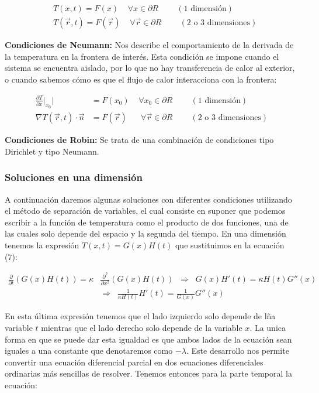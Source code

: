 \documentclass[12pt]{article}
\begin{document}
\begin{align*}
    &T(x,t) = F(x) \;\;\;\; \forall x \in \partial R \;\;\;\;\;\;\;\; (\text{1 dimensión})\\
    &T(\vec{r},t) = F(\vec{r}) \;\;\;\; \forall \vec{r} \in \partial R \;\;\;\;\;\;\;\; (\text{2 o 3 dimensiones})
\end{align*}

\textbf{Condiciones de Neumann: }Nos describe el comportamiento de la derivada de la temperatura en la frontera de interés. Esta condición se impone cuando el sistema se encuentra aislado, por lo que no hay transferencia de calor al exterior, o cuando sabemos cómo es que el flujo de calor interacciona con la frontera:

\begin{align*}
    \frac{\partial T}{\partial x} \Big|_{x_0}| &= F(x_0) \;\;\;\; \forall x_0 \in \partial R \;\;\;\;\;\;\;\; (\text{1 dimensión})\\
    \nabla T(\vec{r},t)\cdot \vec{n} &= F(\vec{r}) \;\;\;\;\;\; \forall \vec{r} \in \partial R \;\;\;\;\;\;\;\; (\text{2 o 3 dimensiones})
\end{align*}

\textbf{Condiciones de Robin: }Se trata de una combinación de condiciones tipo Dirichlet y tipo Neumann. \\

\subsubsection{Soluciones en una dimensión}

A continuación daremos algunas soluciones con diferentes condiciones utilizando el método de separación de variables, el cual consiste en suponer que podemos escribir a la función de temperatura como el producto de dos funciones, una de las cuales solo depende del espacio y la segunda del tiempo. En una dimensión tenemos la expresión $T(x,t) = G(x)H(t)$ que sustituimos en la ecuación (7):

\begin{align*}
    \frac{\partial }{\partial t}\left(G(x)H(t)\right) = \kappa&\frac{\partial^2 }{\partial x^2}\left(G(x)H(t)\right) \;\; \Rightarrow \;\; G(x)H'(t) = \kappa H(t)G''(x) \\
    &\Rightarrow \;\; \frac{1}{\kappa H(t)}H'(t) = \frac{1}{G(x)}G''(x)
\end{align*}

En esta última expresión tenemos que el lado izquierdo solo depende de lña variable $t$ mientras que el lado derecho solo depende de la variable $x$. La unica forma en que se puede dar esta igualdad es que ambos lados de la ecuación sean iguales a una constante que denotaremos como $-\lambda$. Este desarrollo nos permite convertir una ecuación diferencial parcial en dos ecuaciones diferenciales ordinarias más sencillas de resolver. Tenemos entonces para la parte temporal la ecuación:
\end{document}
